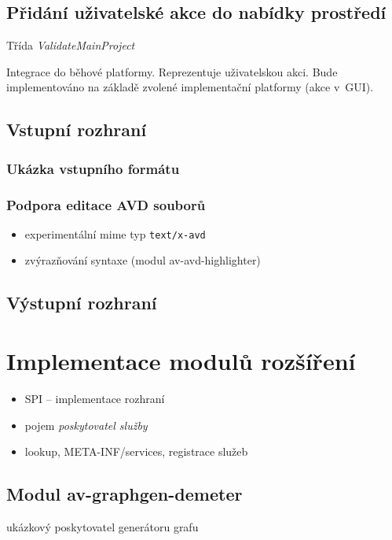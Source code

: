 \subsection{Přidání uživatelské akce do nabídky prostředí}
Třída \emph{ValidateMainProject}

Integrace do běhové platformy. Reprezentuje uživatelskou akci. Bude implementováno na základě zvolené implementační platformy (akce v~GUI).

\subsection{Vstupní rozhraní}
\subsubsection{Ukázka vstupního formátu}


\subsubsection{Podpora editace AVD souborů}
\begin{itemize}
\item experimentální mime typ \verb+text/x-avd+
\item zvýrazňování syntaxe (modul av-avd-highlighter)
\end{itemize}

\subsection{Výstupní rozhraní}

\section{Implementace modulů rozšíření}

\begin{itemize}
\item SPI -- implementace rozhraní
\item pojem \emph{poskytovatel služby}
\item lookup, META-INF/services, registrace služeb
\end{itemize}

\subsection{Modul av-graphgen-demeter}
ukázkový poskytovatel generátoru grafu

